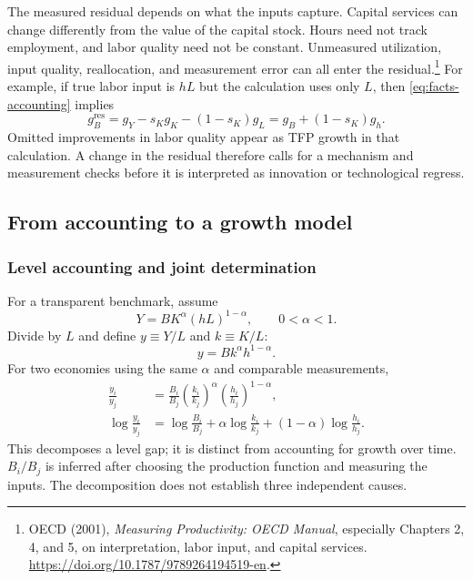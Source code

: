 The measured residual depends on what the inputs capture. Capital services can
change differently from the value of the capital stock. Hours need not track
employment, and labor quality need not be constant. Unmeasured utilization,
input quality, reallocation, and measurement error can all enter the
residual.\footnote{OECD (2001), \textit{Measuring Productivity: OECD Manual},
especially Chapters 2, 4, and 5, on interpretation, labor input, and capital
services. \url{https://doi.org/10.1787/9789264194519-en}.}
For example, if true labor input is $hL$ but the calculation uses only $L$,
then \eqref{eq:facts-accounting} implies
\begin{equation}
g_B^{\mathrm{res}}=g_Y-s_Kg_K-(1-s_K)g_L
=g_B+(1-s_K)g_h.
\end{equation}
Omitted improvements in labor quality appear as TFP growth in that calculation.
A change in the residual therefore calls for a mechanism and measurement checks
before it is interpreted as innovation or technological regress.

\subsection{From accounting to a growth model}

\subsubsection{Level accounting and joint determination}

For a transparent benchmark, assume
\begin{equation}\label{eq:facts-cobb-douglas}
Y=BK^\alpha(hL)^{1-\alpha},\qquad 0<\alpha<1.
\end{equation}
Divide by $L$ and define $y\equiv Y/L$ and $k\equiv K/L$:
\begin{equation}
y=Bk^\alpha h^{1-\alpha}.
\end{equation}
For two economies using the same $\alpha$ and comparable measurements,
\begin{align}
\frac{y_i}{y_j}
&=\frac{B_i}{B_j}\left(\frac{k_i}{k_j}\right)^\alpha
  \left(\frac{h_i}{h_j}\right)^{1-\alpha},\\
\log\frac{y_i}{y_j}
&=\log\frac{B_i}{B_j}+\alpha\log\frac{k_i}{k_j}
 +(1-\alpha)\log\frac{h_i}{h_j}.
\end{align}
This decomposes a level gap; it is distinct from accounting for growth over
time. $B_i/B_j$ is inferred after choosing the production function and measuring
the inputs. The decomposition does not establish three independent causes.

